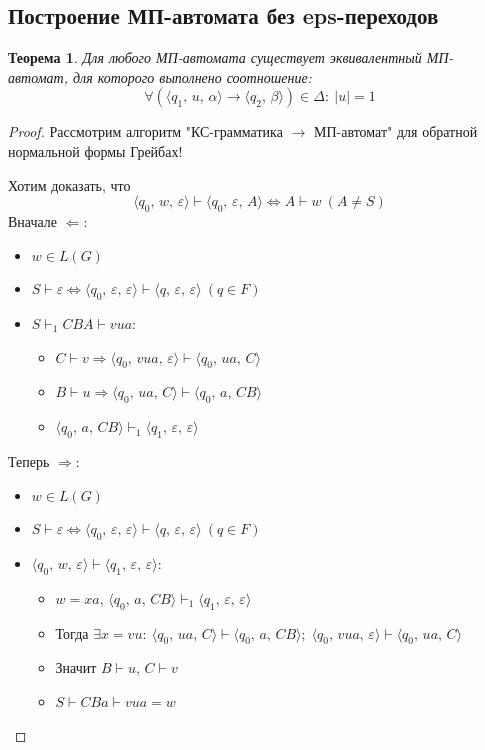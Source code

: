 \documentclass[a4paper,12pt]{article}
\theoremstyle{plain}
\newtheorem{theorem}{Теорема}[subsection]
\theoremstyle{definition}
\theoremstyle{remark}
\begin{document}
\subsection{Построение МП-автомата без eps-переходов}
\begin{theorem}
	Для любого МП-автомата существует эквивалентный МП-автомат, для которого выполнено соотношение:
	\[
		\forall (\langle q_1,\, u,\, \alpha\rangle\to\langle q_2,\, \beta\rangle) \in \Delta :\: \vert u\vert = 1
	\]
\end{theorem}

\begin{proof}
	Рассмотрим алгоритм "КС-грамматика $\to$ МП-автомат" для обратной нормальной формы Грейбах!

	Хотим доказать, что
	\[
		\langle q_0,\, w,\, \varepsilon\rangle\vdash\langle q_0,\, \varepsilon,\, A\rangle \Leftrightarrow A \vdash w \: (A \neq S)
	\]
	Вначале $\Leftarrow$:
	\begin{itemize}
		\item $w \in L(G)$
		\item $S \vdash \varepsilon \Leftrightarrow \langle q_0,\, \varepsilon,\, \varepsilon\rangle \vdash\langle q,\, \varepsilon,\, \varepsilon\rangle \: (q \in F)$
		\item $S \vdash_1 CBA \vdash vua$:
		      \begin{itemize}
			      \item $C \vdash v \Rightarrow \langle q_0,\, vua,\, \varepsilon\rangle \vdash \langle q_0,\, ua,\, C\rangle$
			      \item $B \vdash u \Rightarrow \langle q_0,\, ua,\, C\rangle \vdash \langle q_0,\, a,\, CB\rangle$
			      \item $\langle q_0,\, a,\, CB\rangle \vdash_1\langle q_1,\, \varepsilon,\, \varepsilon\rangle$
		      \end{itemize}
	\end{itemize}
	Теперь $\Rightarrow$:
	\begin{itemize}
		\item $w \in L(G)$
		\item $S \vdash \varepsilon \Leftrightarrow \langle q_0,\, \varepsilon,\, \varepsilon\rangle \vdash\langle q,\, \varepsilon,\, \varepsilon\rangle \: (q \in F)$
		\item $\langle q_0,\, w,\, \varepsilon\rangle\vdash\langle q_1,\, \varepsilon,\, \varepsilon\rangle$:
		      \begin{itemize}
			      \item $w = xa,\, \langle q_0,\, a,\, CB\rangle \vdash_1\langle q_1,\, \varepsilon,\, \varepsilon\rangle$
			      \item Тогда $\exists x = vu :\: \langle q_0,\, ua,\, C\rangle \vdash\langle q_0,\, a,\, CB\rangle;\; \langle q_0,\, vua,\, \varepsilon\rangle \vdash \langle q_0,\, ua,\, C\rangle$
			      \item Значит $B \vdash u,\, C \vdash v$
			      \item $S \vdash CBa \vdash vua = w$
		      \end{itemize}
	\end{itemize}
\end{proof}
\end{document}
